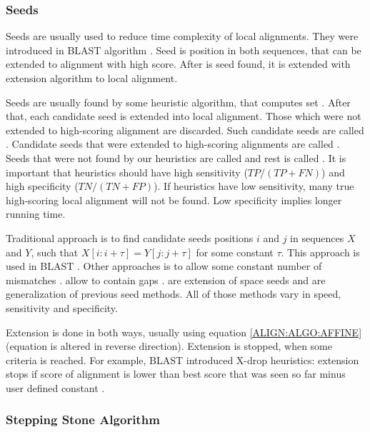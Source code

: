 \subsubsection{Seeds}

Seeds are usually used to reduce time complexity of local alignments.  They were
introduced in BLAST algorithm \cite{Altschul1990}.  Seed is position in both
sequences, that can be extended to alignment with high score. After is seed
found, it is extended with extension algorithm to local alignment.

Seeds are usually found by some heuristic algorithm, that computes set
. After that, each candidate seed is extended into
local alignment. Those which were not extended to high-scoring alignment are
discarded. Such candidate seeds are called .
Candidate seeds that were extended to high-scoring alignments are called
.  Seeds that were not found by our heuristics
are called  and rest is called
. It is important that heuristics should have
high sensitivity ($TP/(TP+FN)$) and high specificity ($TN/(TN+FP)$). If
heuristics have low sensitivity, many true high-scoring local alignment will not
be found. Low specificity implies longer running time. 

Traditional approach is to find candidate seeds positions $i$ and $j$ in
sequences $X$ and $Y$, such that $X[i:i+\tau]=Y[j:j+\tau]$ for some constant
$\tau$. This approach is used in BLAST \cite{Altschul1990}. Other approaches is
to allow some constant number of mismatches \cite{Kent2002}.  allow to contain gaps \cite{Ma2002}. 
\cite{Brejova2005vector} are extension of space seeds and  \cite{Csuros2005} are generalization of previous seed methods. All of
those methods vary in speed, sensitivity and specificity.

Extension is done in both ways, usually using equation \ref{ALIGN:ALGO:AFFINE}
(equation is altered in reverse direction). Extension is stopped, when some
criteria is reached. For example, BLAST introduced X-drop heuristics: extension stops
if score of alignment is lower than best score that was seen so far minus user
defined constant \cite{Altschul1997}.


\subsubsection{Stepping Stone Algorithm}
\label{SECTION:SSA}


